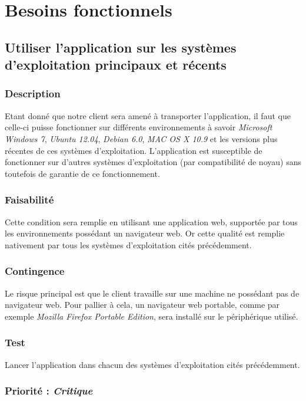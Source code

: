 \section{Besoins fonctionnels}\label{besoins_fonctionnels}

\subsection{Utiliser l’application sur les systèmes d’exploitation principaux et récents}\label{systems}

\subsubsection{Description}
Etant donné que notre client sera amené à transporter l’application, il faut que celle-ci puisse fonctionner sur différents environnements à savoir \textit{Microsoft Windows 7}, \textit{Ubuntu 12.04}, \textit{Debian 6.0}, \textit{MAC OS X 10.9} et les versions plus récentes de ces systèmes d’exploitation.
L’application est susceptible de fonctionner sur d’autres systèmes d’exploitation (par compatibilité de noyau) sans toutefois de garantie de ce fonctionnement. 
\subsubsection{Faisabilité}

Cette condition sera remplie en utilisant une application web, supportée par tous les environnements possédant un navigateur web. Or cette qualité est remplie nativement par tous les systèmes d’exploitation cités précédemment.

\subsubsection{Contingence}

Le risque principal est que le client travaille sur une machine ne possédant pas de navigateur web. Pour pallier à cela, un navigateur web portable, comme par exemple \textit{Mozilla Firefox Portable Edition}, sera installé sur le périphérique utilisé.

\subsubsection{Test}

Lancer l'application dans chacun des systèmes d’exploitation cités précédemment.

\subsubsection{Priorité : \textit{Critique}}

